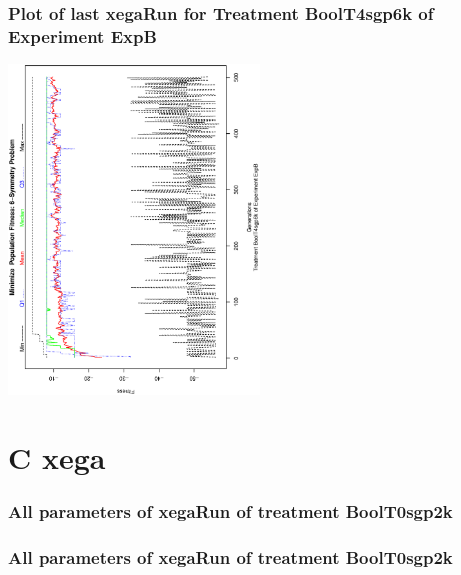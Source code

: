 \documentclass[18pt,c]{beamer}
\makeatletter
\let\beamer@writeslidentry@miniframeson=\beamer@writeslidentry
\newcommand*{\miniframeson}{\let\beamer@writeslidentry=\beamer@writeslidentry@miniframeson}
\makeatother
\begin{document}
 \begin{frame}
 \frametitle{ Plot of last xegaRun for Treatment BoolT4sgp6k of Experiment ExpB }
 \begin{center}
\includegraphics[width=0.5\textwidth, angle=-90]
{ExpBPlotPopStatsFigure024.eps}
 \end{center}
 \label{report/ExpBPlotPopStatsFigure024.eps}  
 \end{frame}

\miniframeson
\section{C xega}

 \begin{frame}
 \fontsize{8pt}{9pt}\selectfont
 \frametitle{  All parameters of xegaRun of treatment BoolT0sgp2k 
 }

 \label{ExpBtParmTable100.tex}  
 \end{frame}


 \begin{frame}
 \fontsize{8pt}{9pt}\selectfont
 \frametitle{  All parameters of xegaRun of treatment BoolT0sgp2k 
 }

 \label{ExpBtParmTable101.tex}  
 \end{frame}
\end{document}
